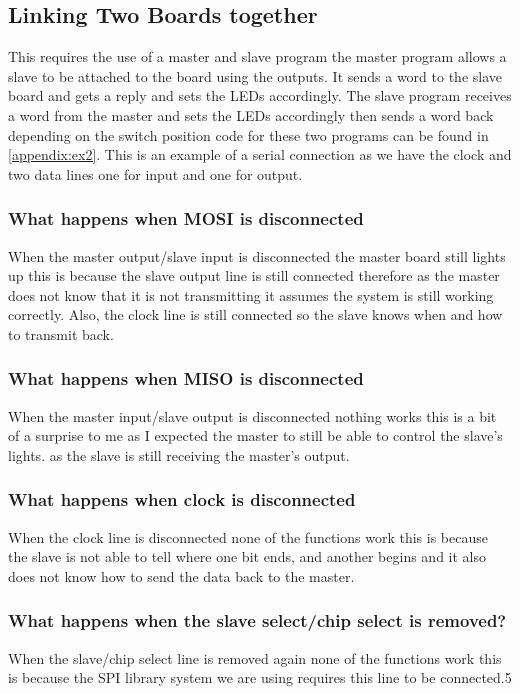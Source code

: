 \documentclass[a4paper,12pt]{scrartcl}
\begin{document}
{		\subsection{Linking Two Boards together}
		{
			This requires the use of a master and slave program the master program allows a slave to be attached to the board using the outputs. It sends a word to the slave board and gets a reply and sets the LEDs accordingly. The slave program receives a word from the master and sets the LEDs accordingly then sends a word back depending on the switch position code for these two programs can be found in \cref{appendix:ex2}. This is an example of a serial connection as we have the clock and two data lines one for input and one for output.
			
			\subsubsection{What happens when MOSI is disconnected}
			{
				When the master output/slave input is disconnected the master board still lights up this is because the slave output line is still connected therefore as the master does not know that it is not transmitting it assumes the system is still working correctly. Also, the clock line is still connected so the slave knows when and how to transmit back.
				
			}
			\subsubsection{What happens when MISO is disconnected}
			{
				When the master input/slave output is disconnected nothing works this is a bit of a surprise to me as I expected the master to still be able to control the slave's lights. as the slave is still receiving the master's output.
			}
			\subsubsection{What happens when clock is disconnected}
			{
				When the clock line is disconnected none of the functions work this is because the slave is not able to tell where one bit ends, and another begins and it also does not know how to send the data back to the master.
			}
			\subsubsection{What happens when the slave select/chip select is removed?}
			{
				When the slave/chip select line is removed again none of the functions work this is because the SPI library system we are using requires this line to be connected.5
			}
		}
}
\end{document}
